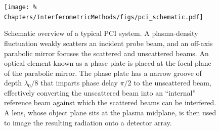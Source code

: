 \begin{figure}
  \centering
  \texttt{[image: \%
    Chapters/InterferometricMethods/figs/pci\_schematic.pdf]}
  \caption[Schematic overview of a typical PCI system]{%
    Schematic overview of a typical PCI system.
    A plasma-density fluctuation weakly scatters an incident probe beam, and
    an off-axis parabolic mirror focuses the scattered and unscattered beams.
    An optical element known as a phase plate
    is placed at the focal plane of the parabolic mirror.
    The phase plate has a narrow groove of depth $\lambda_0 / 8$
    that imparts phase delay $\pi / 2$ to the unscattered beam,
    effectively converting the unscattered beam
    into an ``internal'' reference beam
    against which the scattered beams can be interfered.
    A lens, whose object plane sits at the plasma midplane,
    is then used to image the resulting radiation onto a detector array.}
  \label{fig:InterferometricMethods:pci_schematic}
\end{figure}


